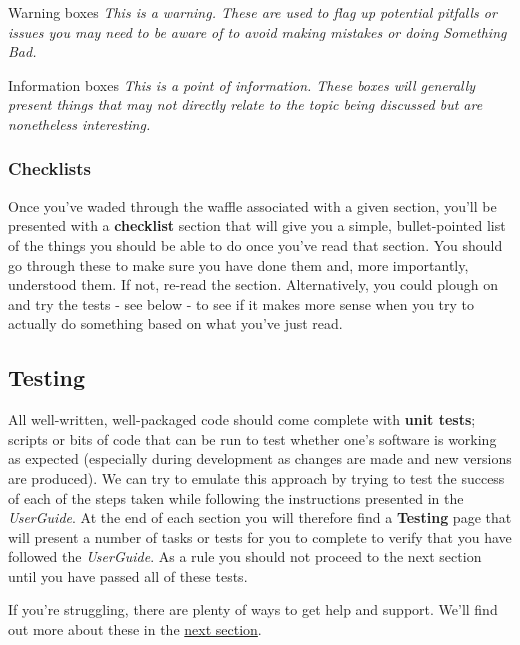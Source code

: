 \begin{warningbox}{Warning boxes}
\emph{This is a warning. These are used to flag up potential pitfalls or
issues you may need to be aware of to avoid making mistakes or doing
Something Bad.}
\end{warningbox}

\begin{infobox}{Information boxes}
\emph{This is a point of information. These boxes will generally present
things that may not directly relate to the topic being discussed but are
nonetheless interesting.}
\end{infobox}

\subsubsection{Checklists}
\label{checklists}
Once you've waded through the waffle associated with a given section,
you'll be presented with a \textbf{checklist} section that will give you
a simple, bullet-pointed list of the things you should be able to do
once you've read that section. You should go through these to make sure
you have done them and, more importantly, understood them. If not,
re-read the section. Alternatively, you could plough on and try the
tests - see below - to see if it makes more sense when you try to
actually do something based on what you've just read.

\subsection{Testing}
\label{testing}
All well-written, well-packaged code should come complete with
\textbf{unit tests}; scripts or bits of code that can be run to test
whether one's software is working as expected (especially during
development as changes are made and new versions are produced). We can
try to emulate this approach by trying to test the success of each of
the steps taken while following the instructions presented in the
\emph{UserGuide}. At the end of each section you will therefore find a
\textbf{Testing} page that will present a number of tasks or tests for
you to complete to verify that you have followed the \emph{UserGuide}.
As a rule you should not proceed to the next section until you have
passed all of these tests.

If you're struggling, there are plenty of ways to get help and support.
We'll find out more about these in the
\hyperref[sec:help]{next section}.
